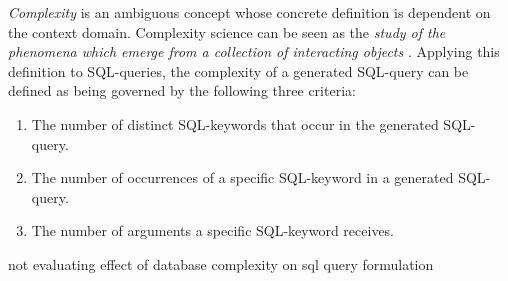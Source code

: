 \textit{Complexity} is an ambiguous concept whose concrete definition is dependent on the context domain. Complexity science can be seen as the \textit{study of the phenomena which emerge from a collection of interacting objects} \cite{johnson2007two}. Applying this definition to SQL-queries, the complexity of a generated SQL-query can be defined as being governed by the following three criteria:
\begin{enumerate}
 \item The number of distinct SQL-keywords that occur in the generated SQL-query.
 \item The number of occurrences of a specific SQL-keyword in a generated SQL-query.
 \item The number of arguments a specific SQL-keyword receives.
 \end{enumerate}
 
 
 \cite{Subali2018ANM}
 
 not evaluating effect of database complexity on sql query formulation \cite{Taipalus2020TheEO}
